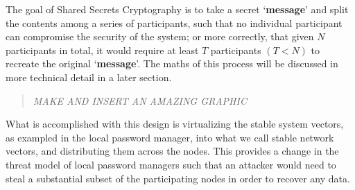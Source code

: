 \documentclass[11pt]{article} %
\def\ssc{Shared Secrets Cryptography\xspace}
\def\ssv{stable system vectors\xspace}
\def\snv{stable network vectors\xspace}
\def\pm{password manager\xspace}
\def\lpm{local \pm}
\def\tm{threat model\xspace}
\def\m{`{\bf message}'\xspace}
\begin{document}
The goal of \ssc is to take a secret \m and split the contents among a series of participants, such that no individual participant can compromise the security of the system; or more correctly, that given \(N\) participants in total, it would require at least \(T\) participants \(\left( T < N \right)\) to recreate the original \m. The maths of this process will be discussed in more technical detail in a later section.

\begin{quote}{\em MAKE AND INSERT AN AMAZING GRAPHIC}\end{quote}


What is accomplished with this design is virtualizing the \ssv, as exampled in the \lpm, into what we call \snv, and distributing them across the nodes. This provides a change in the \tm of \lpm{s} such that an attacker would need to steal a substantial subset of the participating nodes in order to recover any data. 
\end{document}
